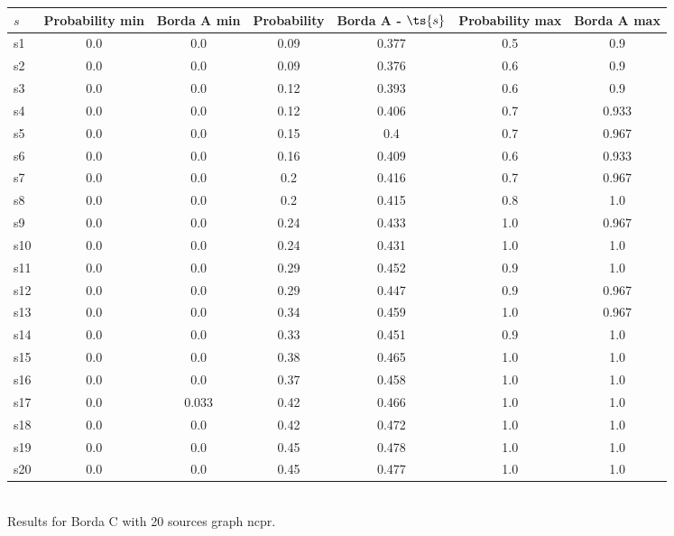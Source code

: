 \documentclass{article}
\begin{document}
\noindent\begin{tabular}{|l|c|c|c|c|c|c|}
\hline
$s$& Probability min & Borda A min & Probability & Borda A - $\ts{s}$ & Probability max & Borda A max\\
\hline
s1 &0.0 & 0.0 & 0.09 & 0.377 & 0.5 & 0.9\\
\hline
s2 &0.0 & 0.0 & 0.09 & 0.376 & 0.6 & 0.9\\
\hline
s3 &0.0 & 0.0 & 0.12 & 0.393 & 0.6 & 0.9\\
\hline
s4 &0.0 & 0.0 & 0.12 & 0.406 & 0.7 & 0.933\\
\hline
s5 &0.0 & 0.0 & 0.15 & 0.4 & 0.7 & 0.967\\
\hline
s6 &0.0 & 0.0 & 0.16 & 0.409 & 0.6 & 0.933\\
\hline
s7 &0.0 & 0.0 & 0.2 & 0.416 & 0.7 & 0.967\\
\hline
s8 &0.0 & 0.0 & 0.2 & 0.415 & 0.8 & 1.0\\
\hline
s9 &0.0 & 0.0 & 0.24 & 0.433 & 1.0 & 0.967\\
\hline
s10 &0.0 & 0.0 & 0.24 & 0.431 & 1.0 & 1.0\\
\hline
s11 &0.0 & 0.0 & 0.29 & 0.452 & 0.9 & 1.0\\
\hline
s12 &0.0 & 0.0 & 0.29 & 0.447 & 0.9 & 0.967\\
\hline
s13 &0.0 & 0.0 & 0.34 & 0.459 & 1.0 & 0.967\\
\hline
s14 &0.0 & 0.0 & 0.33 & 0.451 & 0.9 & 1.0\\
\hline
s15 &0.0 & 0.0 & 0.38 & 0.465 & 1.0 & 1.0\\
\hline
s16 &0.0 & 0.0 & 0.37 & 0.458 & 1.0 & 1.0\\
\hline
s17 &0.0 & 0.033 & 0.42 & 0.466 & 1.0 & 1.0\\
\hline
s18 &0.0 & 0.0 & 0.42 & 0.472 & 1.0 & 1.0\\
\hline
s19 &0.0 & 0.0 & 0.45 & 0.478 & 1.0 & 1.0\\
\hline
s20 &0.0 & 0.0 & 0.45 & 0.477 & 1.0 & 1.0\\
\hline
\end{tabular}\\

\noindent Results for Borda C with 20 sources graph ncpr.
\end{document}
